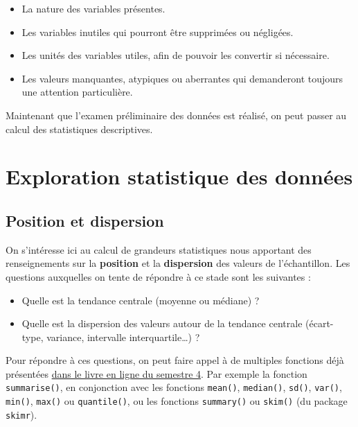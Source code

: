 \documentclass[
  a4paper,
  DIV=11,
  numbers=noendperiod,
  oneside]{scrreprt}
\providecommand{\tightlist}{%
  \setlength{\itemsep}{0pt}\setlength{\parskip}{0pt}}\usepackage{longtable,booktabs,array}
\begin{document}
\begin{itemize}
\tightlist
\item
  La nature des variables présentes.
\item
  Les variables inutiles qui pourront être supprimées ou négligées.
\item
  Les unités des variables utiles, afin de pouvoir les convertir si
  nécessaire.
\item
  Les valeurs manquantes, atypiques ou aberrantes qui demanderont
  toujours une attention particulière.
\end{itemize}

Maintenant que l'examen préliminaire des données est réalisé, on peut
passer au calcul des statistiques descriptives.

\hypertarget{sec-eda}{%
\section{Exploration statistique des données}\label{sec-eda}}

\hypertarget{position-et-dispersion}{%
\subsection{Position et dispersion}\label{position-et-dispersion}}

On s'intéresse ici au calcul de grandeurs statistiques nous apportant
des renseignements sur la \textbf{position} et la \textbf{dispersion}
des valeurs de l'échantillon. Les questions auxquelles on tente de
répondre à ce stade sont les suivantes :

\begin{itemize}
\tightlist
\item
  Quelle est la tendance centrale (moyenne ou médiane) ?
\item
  Quelle est la dispersion des valeurs autour de la tendance centrale
  (écart-type, variance, intervalle interquartile\ldots) ?
\end{itemize}

Pour répondre à ces questions, on peut faire appel à de multiples
fonctions déjà présentées
\href{https://besibo.github.io/BiometrieS4/01-dispersion.html}{dans le
livre en ligne du semestre 4}. Par exemple la fonction
\texttt{summarise()}, en conjonction avec les fonctions \texttt{mean()},
\texttt{median()}, \texttt{sd()}, \texttt{var()}, \texttt{min()},
\texttt{max()} ou \texttt{quantile()}, ou les fonctions
\texttt{summary()} ou \texttt{skim()} (du package \texttt{skimr}).
\end{document}
